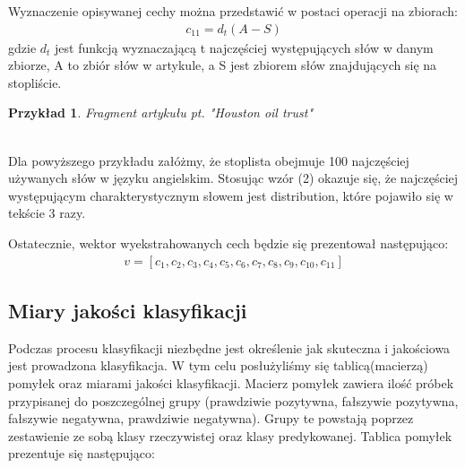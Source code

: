 \documentclass{classrep}
\newtheorem{exmp}{Przykład}[section]
\begin{document}
\begin{enumerate}
	Wyznaczenie opisywanej cechy można przedstawić w postaci operacji na zbiorach:
	\begin{gather}
	c_{11}= d_{t}(A - S)
	\end{gather} 
	\indent gdzie $d_{t}$ jest funkcją wyznaczającą t najczęściej występujących słów w danym zbiorze, A to zbiór słów w artykule, 
	a S jest zbiorem słów znajdujących się na stopliście. \\
	\begin{exmp}
    Fragment artykułu pt. "Houston oil trust"  \cite{reuters} \\
     \\
    \end{exmp} 
    Dla powyższego przykładu załóżmy, że stoplista obejmuje 100 najczęściej używanych słów w języku angielskim. Stosując wzór (2) okazuje się, że najczęściej występującym charakterystycznym słowem jest distribution, które pojawiło się w tekście 3 razy. \\
\end{enumerate}
Ostatecznie, wektor wyekstrahowanych cech będzie się prezentował następująco: 
\begin{gather}
v = [c_{1}, c_{2}, c_{3}, c_{4}, c_{5}, c_{6}, c_{7}, c_{8}, c_{9}, c_{10}, c_{11}] 
\end{gather}

\subsection{Miary jakości klasyfikacji} 
Podczas procesu klasyfikacji niezbędne jest określenie jak skuteczna i jakościowa jest prowadzona klasyfikacja. W tym celu posłużyliśmy się tablicą(macierzą) pomyłek oraz miarami jakości klasyfikacji.\cite{tablica_pomylek} Macierz pomyłek zawiera ilość próbek przypisanej do poszczególnej grupy (prawdziwie pozytywna, fałszywie pozytywna, fałszywie negatywna, prawdziwie negatywna). Grupy te powstają poprzez zestawienie ze sobą klasy rzeczywistej oraz klasy predykowanej. Tablica pomyłek prezentuje się następująco: \\
\end{document}
